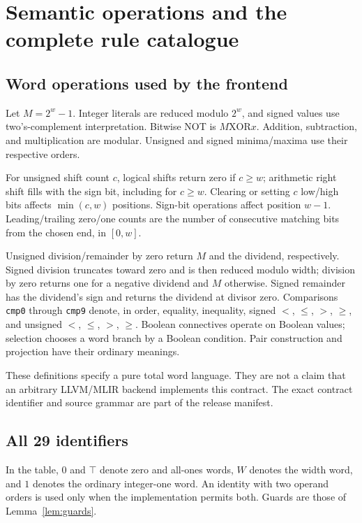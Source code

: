 \section{Semantic operations and the complete rule catalogue}\label{app:rules}

\subsection{Word operations used by the frontend}
Let $M=2^w-1$. Integer literals are reduced modulo $2^w$, and signed values use two's-complement interpretation. Bitwise NOT is $M\mathbin{\mathrm{XOR}}x$. Addition, subtraction, and multiplication are modular. Unsigned and signed minima/maxima use their respective orders.

For unsigned shift count $c$, logical shifts return zero if $c\ge w$; arithmetic right shift fills with the sign bit, including for $c\ge w$. Clearing or setting $c$ low/high bits affects $\min(c,w)$ positions. Sign-bit operations affect position $w-1$. Leading/trailing zero/one counts are the number of consecutive matching bits from the chosen end, in $[0,w]$.

Unsigned division/remainder by zero return $M$ and the dividend, respectively. Signed division truncates toward zero and is then reduced modulo width; division by zero returns one for a negative dividend and $M$ otherwise. Signed remainder has the dividend's sign and returns the dividend at divisor zero. Comparisons \texttt{cmp0} through \texttt{cmp9} denote, in order, equality, inequality, signed $<$, $\le$, $>$, $\ge$, and unsigned $<$, $\le$, $>$, $\ge$. Boolean connectives operate on Boolean values; selection chooses a word branch by a Boolean condition. Pair construction and projection have their ordinary meanings.

These definitions specify a pure total word language. They are not a claim that an arbitrary LLVM/MLIR backend implements this contract. The exact contract identifier and source grammar are part of the release manifest.

\subsection{All 29 identifiers}
In the table, $0$ and $\top$ denote zero and all-ones words, $W$ denotes the width word, and $1$ denotes the ordinary integer-one word. An identity with two operand orders is used only when the implementation permits both. Guards are those of Lemma~\ref{lem:guards}.

